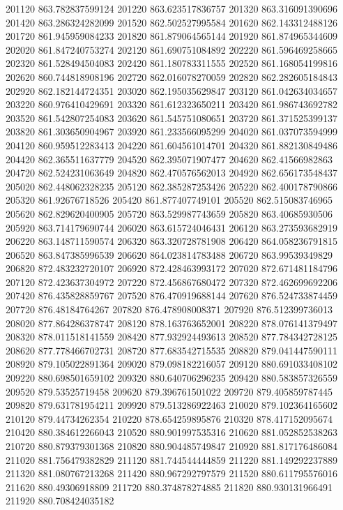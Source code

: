 {201120 863.782837599124
201220 863.623517836757
201320 863.316091390696
201420 863.286324282099
201520 862.502527995584
201620 862.143312488126
201720 861.945959084233
201820 861.879064565144
201920 861.874965344609
202020 861.847240753274
202120 861.690751084892
202220 861.596469258665
202320 861.528494504083
202420 861.180783311555
202520 861.168054199816
202620 860.744818908196
202720 862.016078270059
202820 862.282605184843
202920 862.182144724351
203020 862.195035629847
203120 861.042634034657
203220 860.976410429691
203320 861.612323650211
203420 861.986743692782
203520 861.542807254083
203620 861.545751080651
203720 861.371525399137
203820 861.303650904967
203920 861.233566095299
204020 861.037073594999
204120 860.959512283413
204220 861.604561014701
204320 861.882130849486
204420 862.365511637779
204520 862.395071907477
204620 862.41566982863
204720 862.524231063649
204820 862.470576562013
204920 862.656173548437
205020 862.448062328235
205120 862.385287253426
205220 862.400178790866
205320 861.92676718526
205420 861.877407749101
205520 862.515083746965
205620 862.829620400905
205720 863.529987743659
205820 863.40685930506
205920 863.714179690744
206020 863.615724046431
206120 863.273593682919
206220 863.148711590574
206320 863.320728781908
206420 864.058236791815
206520 863.847385996539
206620 864.023814783488
206720 863.99539349829
206820 872.483232720107
206920 872.428463993172
207020 872.671481184796
207120 872.423637304972
207220 872.456867680472
207320 872.462699692206
207420 876.435828859767
207520 876.470919688144
207620 876.524733874459
207720 876.48184764267
207820 876.478908008371
207920 876.512399736013
208020 877.864286378747
208120 878.163763652001
208220 878.076141379497
208320 878.011518141559
208420 877.932924493613
208520 877.784342728125
208620 877.778466702731
208720 877.683542715535
208820 879.041447590111
208920 879.105022891364
209020 879.098182216057
209120 880.691033408102
209220 880.698501659102
209320 880.640706296235
209420 880.583857326559
209520 879.53525719458
209620 879.396761501022
209720 879.405859787445
209820 879.631781954211
209920 879.513286922463
210020 879.102364165602
210120 879.44734262354
210220 878.654259895876
210320 878.417152095674
210420 880.384612266043
210520 880.901997535316
210620 881.052852538263
210720 880.879379301368
210820 880.904485749847
210920 881.817176486084
211020 881.756479382829
211120 881.744544444859
211220 881.149292237889
211320 881.080767213268
211420 880.967292797579
211520 880.611795576016
211620 880.49306918809
211720 880.374878274885
211820 880.930131966491
211920 880.708424035182
}
